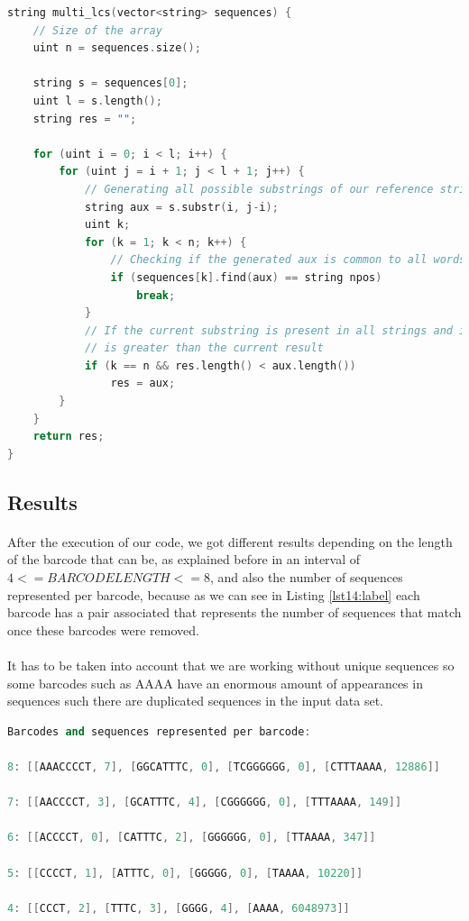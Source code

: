 \documentclass[a4paper,10pt]{article}
\begin{document}
\begin{lstlisting}[language=c++, caption=Multi LCS algorithm, label={lst13:label}]
string multi_lcs(vector<string> sequences) {
    // Size of the array
    uint n = sequences.size();

    string s = sequences[0];
    uint l = s.length();
    string res = "";

    for (uint i = 0; i < l; i++) {
        for (uint j = i + 1; j < l + 1; j++) {
            // Generating all possible substrings of our reference string s
            string aux = s.substr(i, j-i);
            uint k;
            for (k = 1; k < n; k++) {
                // Checking if the generated aux is common to all words
                if (sequences[k].find(aux) == string npos)
					break;
            } 
			// If the current substring is present in all strings and its length
            // is greater than the current result
            if (k == n && res.length() < aux.length())
                res = aux;
        }
    }
    return res;
}
\end{lstlisting}

\subsection{Results}

\paragraph{} After the execution of our code, we got different results depending on the length of the barcode that can be, as explained before in an interval of $4 <= BARCODELENGTH <= 8$, and also the number of sequences represented per barcode, because as we can see in Listing \ref{lst14:label} each barcode has a pair associated that represents the number of sequences that match once these barcodes were removed.\\
\\
It has to be taken into account that we are working without unique sequences so some barcodes such as AAAA have an enormous amount of appearances in sequences such there are duplicated sequences in the input data set.

\vspace{5mm} %

\begin{lstlisting}[language=c++, caption=Results for the barcode identifying process, label={lst14:label}]
Barcodes and sequences represented per barcode:

8: [[AAACCCCT, 7], [GGCATTTC, 0], [TCGGGGGG, 0], [CTTTAAAA, 12886]]

7: [[AACCCCT, 3], [GCATTTC, 4], [CGGGGGG, 0], [TTTAAAA, 149]]

6: [[ACCCCT, 0], [CATTTC, 2], [GGGGGG, 0], [TTAAAA, 347]]

5: [[CCCCT, 1], [ATTTC, 0], [GGGGG, 0], [TAAAA, 10220]]

4: [[CCCT, 2], [TTTC, 3], [GGGG, 4], [AAAA, 6048973]]
\end{lstlisting}
\end{document}
